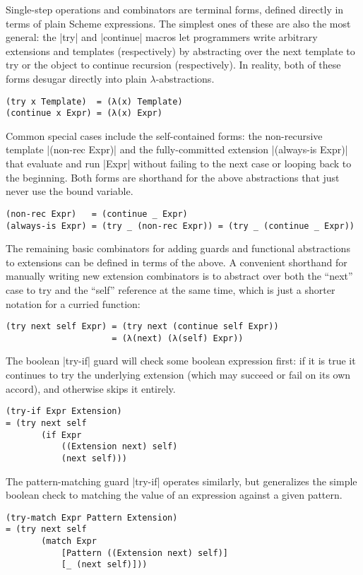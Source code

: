 Single-step operations and combinators are terminal forms, defined directly in terms of plain Scheme expressions.
The simplest ones of these are also the most general:
the \scm|try| and \scm|continue| macros let programmers write arbitrary extensions and templates (respectively) by abstracting over the next template to try or the object to continue recursion (respectively).
In reality, both of these forms desugar directly into plain $\lambda$-abstractions.
\begin{verbatim}
(try x Template)  = (λ(x) Template)
(continue x Expr) = (λ(x) Expr)
\end{verbatim}
Common special cases include the self-contained forms:
the non-recursive template \scm|(non-rec Expr)| and the fully-committed extension \scm|(always-is Expr)| that evaluate and run \scm|Expr| without failing to the next case or looping back to the beginning.
Both forms are shorthand for the above abstractions that just never use the bound variable.
\begin{verbatim}
(non-rec Expr)   = (continue _ Expr)
(always-is Expr) = (try _ (non-rec Expr)) = (try _ (continue _ Expr))
\end{verbatim}

The remaining basic combinators for adding guards and functional abstractions to extensions can be defined in terms of the above.
A convenient shorthand for manually writing new extension combinators is to abstract over both the ``next'' case to try and the ``self'' reference at the same time, which is just a shorter notation for a curried function:
\begin{verbatim}
(try next self Expr) = (try next (continue self Expr))
                     = (λ(next) (λ(self) Expr))
\end{verbatim}
The boolean \scm|try-if| guard will check some boolean expression first:
if it is true it continues to try the underlying extension (which may succeed or fail on its own accord), and otherwise skips it entirely.
\begin{verbatim}
(try-if Expr Extension)
= (try next self
       (if Expr
           ((Extension next) self)
           (next self)))
\end{verbatim}
The pattern-matching guard \scm|try-if| operates similarly, but generalizes the simple boolean check to matching the value of an expression against a given pattern.
\begin{verbatim}
(try-match Expr Pattern Extension)
= (try next self
       (match Expr
           [Pattern ((Extension next) self)]
           [_ (next self)]))
\end{verbatim}


